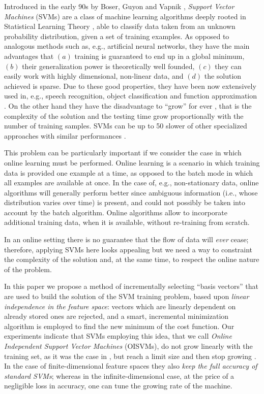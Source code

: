 Introduced in the early 90s by Boser, Guyon and Vapnik \cite{BGV92},
\emph{Support Vector Machines} (SVMs) are a class of machine learning
algorithms deeply rooted in Statistical Learning Theory
\cite{v-edbed-82}, able to classify data taken from an unknown
probability distribution, given a set of training examples. As opposed
to analogous methods such as, e.g., artificial neural networks, they
have the main advantages that $(a)$ training is guaranteed to end up
in a global minimum, $(b)$ their generalization power is theoretically
well founded, $(c)$ they can easily work with highly dimensional,
non-linear data, and $(d)$ the solution achieved is sparse. Due to
these good properties, they have been now extensively used in, e.g.,
speech recognition, object classification and function approximation
\cite{Cristianini00}. On the other hand they have the disadvantage to
``grow'' for ever \cite{Steinwart03}, that is the complexity of the solution and the testing
time grow proportionally with the number of training samples.
SVMs can be up to 50 slower of other specialized approaches with
similar performances \cite{BurgesS96}.

This problem can be particularly important if we consider the case in
which online learning must be performed. Online learning is a
scenario in which training data is provided one example at a time, as
opposed to the batch mode in which all examples are available at once.
In the case of, e.g.,
non-stationary data, online algorithms will generally perform better
since ambiguous information (i.e., whose distribution varies over
time) is present, and could not possibly be taken into account by the
batch algorithm. Online algorithms allow to incorporate additional
training data, when it is available, without re-training from scratch.

In an online setting there is no guarantee that the flow of data will
\emph{ever} cease; therefore, applying SVMs here looks appealing but
we need a way to constraint the complexity of the solution and, at the
same time, to respect the online nature of the problem. 

In this paper we propose a method of incrementally selecting ``basis
vectors'' that are used to build the solution of the SVM training problem,
based upon \emph{linear independence in the feature space}: vectors which are
linearly dependent on already stored ones are rejected, and a smart,
incremental minimization algorithm is employed to find the new minimum
of the cost function. Our experiments
indicate that SVMs employing this idea, that we call
\emph{Online Independent Support Vector Machines} (OISVMs), do not
grow linearly with the training set, as it was the case in
\cite{Steinwart03}, but reach a limit size and then stop growing
\cite{engel2004}. In the case of finite-dimensional feature spaces
they also \emph{keep the full accuracy of standard SVMs}; whereas in
the infinite-dimensional case, at the price of a negligible loss in
accuracy, one can tune the growing rate of the machine.

